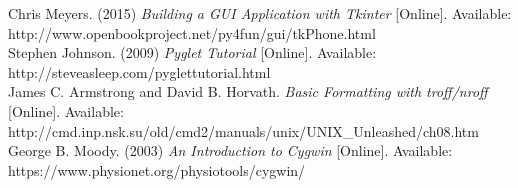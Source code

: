 \documentclass[journal,10pt,onecolumn,compsoc]{IEEEtran} \usepackage[margin=1.0in]{geometry} \usepackage{pdfpages} \usepackage{graphicx}
\begin{document}
\begin{thebibliography}{1}
 Chris Meyers. (2015) {\em Building a GUI Application with Tkinter} [Online]. Available: http://www.openbookproject.net/py4fun/gui/tkPhone.html
\\
 Stephen Johnson. (2009) {\em Pyglet Tutorial} [Online]. Available: http://steveasleep.com/pyglettutorial.html
\\
 James C. Armstrong and David B. Horvath. {\em Basic Formatting with troff/nroff} [Online]. Available: http://cmd.inp.nsk.su/old/cmd2/manuals/unix/UNIX\_Unleashed/ch08.htm
\\
 George B. Moody. (2003) {\em An Introduction to Cygwin} [Online]. Available: https://www.physionet.org/physiotools/cygwin/
\\
\end{thebibliography}
\end{document}
